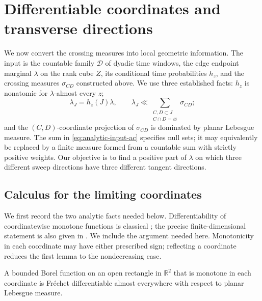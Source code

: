 \section{Differentiable coordinates and transverse directions}
\label{sec:differentiability}

We now convert the crossing measures into local geometric information.
The input is the countable family $\mathcal D$ of dyadic time windows,
the edge endpoint marginal $\lambda$ on the rank cube $Z$, its conditional time
probabilities $h_z$, and the crossing measures $\sigma_{CD}$ constructed
above.  We use three established facts: $h_z$ is nonatomic for
$\lambda$-almost every $z$;
\begin{equation}
 \lambda_J=h_z(J)\lambda,
 \qquad
 \lambda_J\ll\sum_{\substack{C,D\subset J\\ C\cap D=\varnothing}}
                 \sigma_{CD};
 \label{eq:analytic-input-ac}
\end{equation}
and the $(C,D)$-coordinate projection of $\sigma_{CD}$ is dominated by
planar Lebesgue measure.  The sum in \eqref{eq:analytic-input-ac} specifies
null sets; it may equivalently be replaced by a finite measure formed
from a countable sum with strictly positive weights.  Our objective is
to find a positive part of $\lambda$ on which
three different sweep directions have three different tangent directions.

\subsection{Calculus for the limiting coordinates}

We first record the two analytic facts needed below. Differentiability
of coordinatewise monotone functions is classical
\cite{ChabrillacCrouzeix1987}; the precise finite-dimensional statement
is also given in \cite[Theorem~1(f)]{BorweinBurkeLewis2004}.
We include the argument needed here. Monotonicity in
each coordinate may have either prescribed sign; reflecting a coordinate
reduces the first lemma to the nondecreasing case.

\begin{lemma}\label{lem:monotone-differentiability}
A bounded Borel function on an open rectangle in $\mathbb R^2$ that is
monotone in each coordinate is Fr\'echet differentiable almost everywhere
with respect to planar Lebesgue measure.
\end{lemma}

